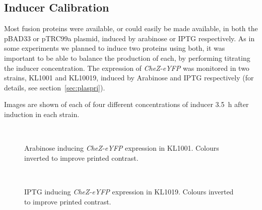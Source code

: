 \documentclass[../main.tex]{subfiles}
\begin{document}
\subsection{Inducer Calibration}

Most fusion proteins were available, or could easily be made available, in both the pBAD33 or pTRC99a plasmid, induced by arabinose or IPTG respectively. As in some experiments we planned to induce two proteins using both, it was important to be able to balance the production of each, by performing titrating the inducer concentration. The expression of \textsl{CheZ-eYFP} was monitored in two strains, KL1001 and KL10019, induced by Arabinose and IPTG respectively (for details, see section~\ref{sec:plaspri}).

Images are shown of each of four different concentrations of inducer \SI{3.5}{\hour} after induction in each strain.

\begin{figure}
\begin{center}
\\
\caption[Arabinose inducer titration]{Arabinose inducing \textsl{CheZ-eYFP} expression in KL1001. Colours inverted to improve printed contrast.}
\end{center}
\end{figure}

\begin{figure}
\begin{center}
\\
\caption[IPTG inducer titration]{IPTG inducing \textsl{CheZ-eYFP} expression in KL1019. Colours inverted to improve printed contrast.}
\end{center}
\end{figure}
\end{document}
